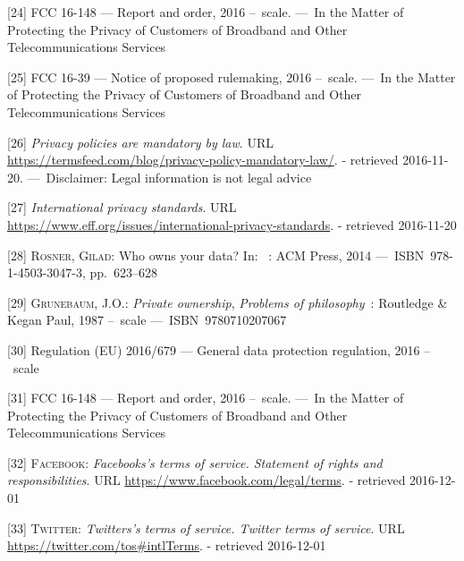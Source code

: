\documentclass[12pt,english,a4paper,titlepage,cleardoublepage=empty,dottedtoc]{report}
\begin{document}
\hypertarget{ref-rules_2016_fcc_to-protect-broadband-consumer-privacy_sensitive-types-of-data}{}
{[}24{]} FCC 16-148 --- Report and order, 2016 --~scale. ---~In the
Matter of Protecting the Privacy of Customers of Broadband and Other
Telecommunications Services

\hypertarget{ref-rules_2016_fcc_to-protect-broadband-consumer-privacy_personally-identifiable-information}{}
{[}25{]} FCC 16-39 --- Notice of proposed rulemaking, 2016 --~scale.
---~In the Matter of Protecting the Privacy of Customers of Broadband
and Other Telecommunications Services

\hypertarget{ref-web_2016_privacy-policies-are-mandatory-by-law}{}
{[}26{]} \emph{Privacy policies are mandatory by law}. URL
\url{https://termsfeed.com/blog/privacy-policy-mandatory-law/}. -
retrieved 2016-11-20. ---~Disclaimer: Legal information is not legal
advice

\hypertarget{ref-web_2016_international-privacy-standards}{}
{[}27{]} \emph{International privacy standards}. URL
\url{https://www.eff.org/issues/international-privacy-standards}. -
retrieved 2016-11-20

\hypertarget{ref-paper_2014_who-owns-yours-data}{}
{[}28{]} \textsc{Rosner, Gilad}: Who owns your data? In: ~: ACM Press,
2014 ---~ISBN~978-1-4503-3047-3, pp.~623--628

\hypertarget{ref-book_1987_private-ownership_definition}{}
{[}29{]} \textsc{Grunebaum, J.O.}: \emph{Private ownership},
\emph{Problems of philosophy}~: Routledge \& Kegan Paul, 1987 --~scale
---~ISBN~9780710207067

\hypertarget{ref-regulation_2016_eu_general-data-protection-regulation_ownership}{}
{[}30{]} Regulation (EU) 2016/679 --- General data protection
regulation, 2016 --~scale

\hypertarget{ref-rules_2016_fcc_to-protect-broadband-consumer-privacy_ownership}{}
{[}31{]} FCC 16-148 --- Report and order, 2016 --~scale. ---~In the
Matter of Protecting the Privacy of Customers of Broadband and Other
Telecommunications Services

\hypertarget{ref-web_2016_facebook_terms-of-service}{}
{[}32{]} \textsc{Facebook}: \emph{Facebooks's terms of service.
Statement of rights and responsibilities}. URL
\url{https://www.facebook.com/legal/terms}. - retrieved 2016-12-01

\hypertarget{ref-web_2016_twitter_terms-of-service}{}
{[}33{]} \textsc{Twitter}: \emph{Twitters's terms of service. Twitter
terms of service}. URL \url{https://twitter.com/tos\#intlTerms}. -
retrieved 2016-12-01
\end{document}

